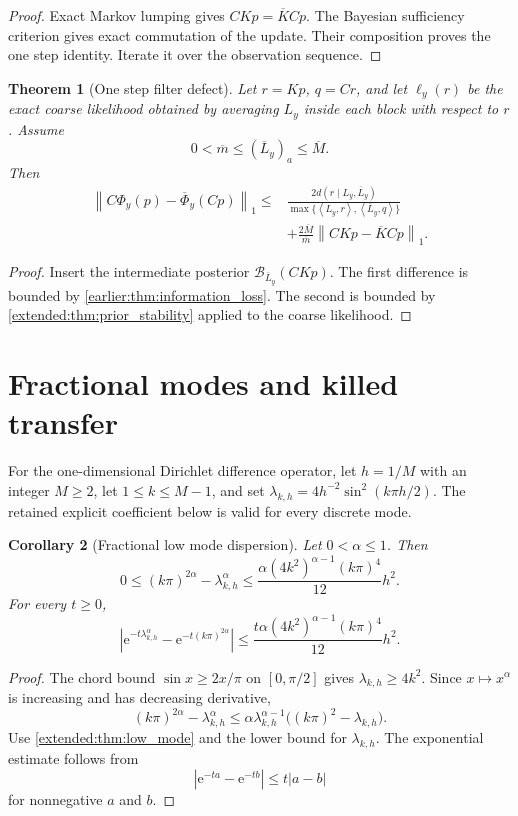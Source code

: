 \documentclass[11pt,a4paper]{article}
\newtheorem{theorem}{Theorem}[section]
\newtheorem{corollary}[theorem]{Corollary}
\theoremstyle{definition}
\theoremstyle{remark}
\newcommand{\norm}[1]{\left\lVert#1\right\rVert}
\newcommand{\Bcal}{\mathcal B}
\newcommand{\e}{\mathrm e}
\newcommand{\abs}[1]{\left\lvert#1\right\rvert}
\newcommand{\ip}[2]{\left\langle#1,#2\right\rangle}
\begin{document}
\begin{proof}
Exact Markov lumping gives \(CKp=\overline KCp\). The Bayesian sufficiency criterion gives exact commutation of the update. Their composition proves the one step identity. Iterate it over the observation sequence.
\end{proof}

\begin{theorem}[One step filter defect]\label{earlier:record:017}\label{earlier:thm:filter_defect}
Let \(r=Kp\), \(q=Cr\), and let \(\ell_y(r)\) be the exact coarse likelihood obtained by averaging \(L_y\) inside each block with respect to \(r\). Assume
\[
0<\overline m\leq(\overline L_y)_a\leq\overline M.
\]
Then
\[
\begin{aligned}
\norm{C\Phi_y(p)-\overline\Phi_y(Cp)}_1
\leq{}&
\frac{2d(r\mid L_y,\overline L_y)}
{\max\{\ip{L_y}{r},\ip{\overline L_y}{q}\}}\\
&+
\frac{2\overline M}{\overline m}
\norm{CKp-\overline KCp}_1.
\end{aligned}
\]
\end{theorem}

\begin{proof}
Insert the intermediate posterior \(\Bcal_{\overline L_y}(CKp)\). The first difference is bounded by \cref{earlier:thm:information_loss}. The second is bounded by \cref{extended:thm:prior_stability} applied to the coarse likelihood.
\end{proof}


\section{Fractional modes and killed transfer}\label{earlier:section:04}
For the one-dimensional Dirichlet difference operator, let $h=1/M$ with an integer $M\geq2$, let $1\leq k\leq M-1$, and set $\lambda_{k,h}=4h^{-2}\sin^2(k\pi h/2)$. The retained explicit coefficient below is valid for every discrete mode.
\begin{corollary}[Fractional low mode dispersion]\label{earlier:record:018}\label{earlier:cor:fractional_low_mode_dispersion}
Let \(0<\alpha\leq1\). Then
\[
0
\leq
(k\pi)^{2\alpha}-\lambda_{k,h}^\alpha
\leq
\frac{\alpha(4k^2)^{\alpha-1}(k\pi)^4}{12}h^2.
\]
For every \(t\geq0\),
\[
\abs{
\e^{-t\lambda_{k,h}^\alpha}
-
\e^{-t(k\pi)^{2\alpha}}
}
\leq
\frac{t\alpha(4k^2)^{\alpha-1}(k\pi)^4}{12}h^2.
\]
\end{corollary}

\begin{proof}
The chord bound \(\sin x\geq2x/\pi\) on \([0,\pi/2]\) gives \(\lambda_{k,h}\geq4k^2\). Since \(x\mapsto x^\alpha\) is increasing and has decreasing derivative,
\[
(k\pi)^{2\alpha}-\lambda_{k,h}^\alpha
\leq
\alpha\lambda_{k,h}^{\alpha-1}
\bigl((k\pi)^2-\lambda_{k,h}\bigr).
\]
Use \cref{extended:thm:low_mode} and the lower bound for \(\lambda_{k,h}\). The exponential estimate follows from
\[
\abs{\e^{-ta}-\e^{-tb}}
\leq t\abs{a-b}
\]
for nonnegative \(a\) and \(b\).
\end{proof}
\end{document}
